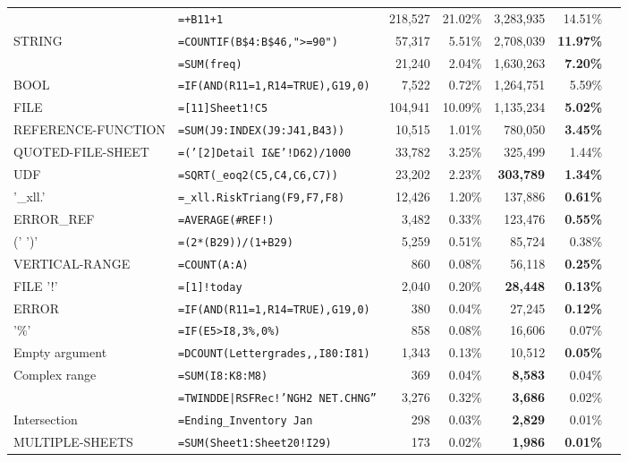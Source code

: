 \documentclass[conference]{IEEEtran}
\begin{document}
\begin{table}
\begin{tabular}{llrrrrr}
		\synt{UnOpPrefix} & \texttt{=+B11+1}  & 218,527 & 21.02\% & 3,283,935 & 14.51\%\\
		STRING & \texttt{=COUNTIF(B\$4:B\$46,">=90")}  & 57,317 & 5.51\% & 2,708,039 &\textbf{11.97\%}\\
		\synt{NamedRange} & \texttt{=SUM(freq)}  & 21,240 & 2.04\% & 1,630,263 & \textbf{7.20\%}\\
		BOOL & \texttt{=IF(AND(R11=1,R14=TRUE),G19,0)}  & 7,522 & 0.72\% & 1,264,751 & 5.59\%\\
		FILE & \texttt{=[11]Sheet1!C5}  & 104,941 & 10.09\% & 1,135,234 & \textbf{5.02\%}\\
		REFERENCE-FUNCTION & \texttt{=SUM(J9:INDEX(J9:J41,B43))}  & 10,515 & 1.01\% & 780,050 &\textbf{ 3.45\%}\\
		QUOTED-FILE-SHEET & \texttt{=('[2]Detail I\&E'!D62)/1000}  & 33,782 & 3.25\% & 325,499 & 1.44\%\\
		UDF & \texttt{=SQRT(_eoq2(C5,C4,C6,C7))}  & 23,202 & 2.23\% & \textbf{303,789} & \textbf{1.34\%}\\
		'_xll.' & \texttt{=_xll.RiskTriang(F9,F7,F8)}  & 12,426 & 1.20\% & 137,886 & \textbf{0.61\%}\\
		ERROR_REF & \texttt{=AVERAGE(\#REF!)}  & 3,482 & 0.33\% & 123,476 & \textbf{0.55\%}\\
		(' \synt{Reference} ')' & \texttt{=(2*(B29))/(1+B29)}  & 5,259 & 0.51\% & 85,724 & 0.38\%\\
		VERTICAL-RANGE & \texttt{=COUNT(A:A)}  & 860 & 0.08\% & 56,118 & \textbf{0.25\%}\\
		FILE '!' & \texttt{=[1]!today}  & 2,040 & 0.20\% & \textbf{28,448} &\textbf{0.13\%}\\
		ERROR & \texttt{=IF(AND(R11=1,R14=TRUE),G19,0)}  & 380 & 0.04\% & 27,245 & \textbf{0.12\%}\\
		'\%' & \texttt{=IF(E5>I8,3\%,0\%)}  & 858 & 0.08\% & 16,606 & 0.07\%\\
			Empty argument & \texttt{=DCOUNT(Lettergrades,,I80:I81)}  & 1,343 & 0.13\% & 10,512 & \textbf{0.05\%}\\
			Complex range & \texttt{=SUM(I8:K8:M8)}  & 369 & 0.04\% & \textbf{8,583} & 0.04\%\\
			\synt{DynamicDataExchange} & \texttt{=TWINDDE|RSFRec!'NGH2 NET.CHNG''}  & 3,276 & 0.32\% & \textbf{3,686} & 0.02\%\\
			Intersection & \texttt{=Ending_Inventory Jan}  & 298 & 0.03\% & \textbf{2,829} & 0.01\%\\
			MULTIPLE-SHEETS & \texttt{=SUM(Sheet1:Sheet20!I29)}  & 173 & 0.02\% &\textbf{1,986} &\textbf{ 0.01\%}\\

\end{tabular}
\end{table}
\end{document}
